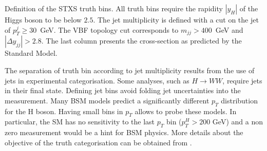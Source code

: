 \begin{sidewaystable}
\caption{Definition of the STXS truth bins. All truth bins require the rapidity $|y_H|$ of the Higgs boson to be below $2.5$. The jet multiplicity is defined with a cut on the jet of $p_T^j\ge 30$~GeV. The VBF topology cut corresponds to $m_{jj}>400$~GeV and $|\Delta y_{jj}|>2.8$. The last column presents the cross-section as predicted by the Standard Model. \cite{ATL-COM-PHYS-2016-1784}}
\label{tab:HGam_stxs_definition}
\end{sidewaystable}


The separation of truth bin according to jet multiplicity results from the use of jets in experimental categorisation.
Some analyses, such as \(H\rightarrow WW\), require jets in their final state.
Defining jet bins avoid folding jet uncertainties into the measurement.
Many BSM models predict a significantly different $p_T$ distribution for the H boson.
Having small bins in $p_T$ allows to probe these models.
In particular, the SM has no sensitivity to the last $p_T$ bin ($p_T^H>200$ GeV) and a non zero measurement would be a hint for BSM physics.
More details about the objective of the truth categorisation can be obtained from \cite{arXiv_1605.04692,ATL-COM-PHYS-2016-1784}.


